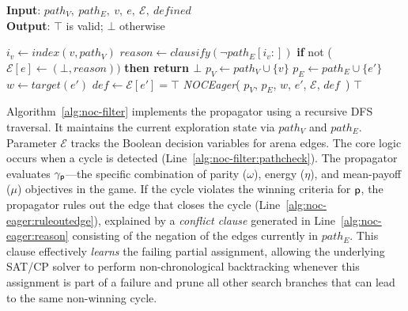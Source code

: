 \documentclass[a4paper,UKenglish,cleveref, autoref, thm-restate]{lipics-v2021}
\begin{document}
\begin{algorithm}[htb]
\small
\caption{\textbf{\textit{NOCFilter}}}
\textbf{Input}: $path_V,\ path_E,\ v,\ e,\ \mathcal{E},\ \textit{defined}$ \\
\textbf{Output}: $\top$ is valid; $\bot$ otherwise
\begin{algorithmic}[1]
     \label{alg:noc-filter:pathcheck}
        \STATE $i_v \gets \textit{index}(v, path_V)$
        \IF{$\neg \gamma_{\player}$} \label{alg:noc-filter:condition}
            \STATE $\textit{reason} \gets \textit{clausify}(\neg path_E[i_v:])$ \label{alg:noc-eager:reason}
            \STATE \textbf{if }not ($\mathcal{E}[e] \gets (\bot, \textit{reason}))$ \textbf{then return $\bot$} \label{alg:noc-eager:ruleoutedge}
        \ENDIF
     \label{alg:noc-eager:defcheck}
         \label{alg:no-opponent-cycle-f1:edgecheck}
            \STATE $p_V \gets path_V \cup \{v\}$
            \STATE $p_E \gets path_E \cup \{e'\}$
            \STATE $w \gets \textit{target}(e')$
            \STATE $\textit{def} \gets \mathcal{E}[e'] = \top$
            \STATE \textit{NOCEager}(
                $p_V$,
                $p_E$,
                $w$,
                $e'$,
                $\mathcal{E}$,
                $\textit{def}$\ )
        \ENDFOR
    \ENDIF
    \RETURN $\top$
\end{algorithmic}
\label{alg:noc-filter}
\end{algorithm}

Algorithm~\ref{alg:noc-filter} implements the \noc propagator using a recursive DFS traversal. It maintains the current exploration state via $path_V$ and $path_E$. Parameter $\mathcal{E}$ tracks the Boolean decision variables for arena edges. The core logic occurs when a cycle is detected (Line~\ref{alg:noc-filter:pathcheck}). The propagator evaluates $\gamma_{\mathsf{p}}$---the specific combination of parity ($\omega$), energy ($\eta$), and mean-payoff ($\mu$) objectives in the game. 
%
If the cycle violates the winning criteria for $\mathsf{p}$, the propagator rules out the edge that closes the cycle (Line~\ref{alg:noc-eager:ruleoutedge}), explained by a \textit{conflict clause} generated in Line~\ref{alg:noc-eager:reason} consisting of the negation of the edges currently in $path_E$. This clause effectively {\em learns} the failing partial assignment, allowing the underlying SAT/CP solver to perform non-chronological backtracking whenever this assignment is part of a failure and prune all other search branches that can lead to the same non-winning cycle.
\end{document}
